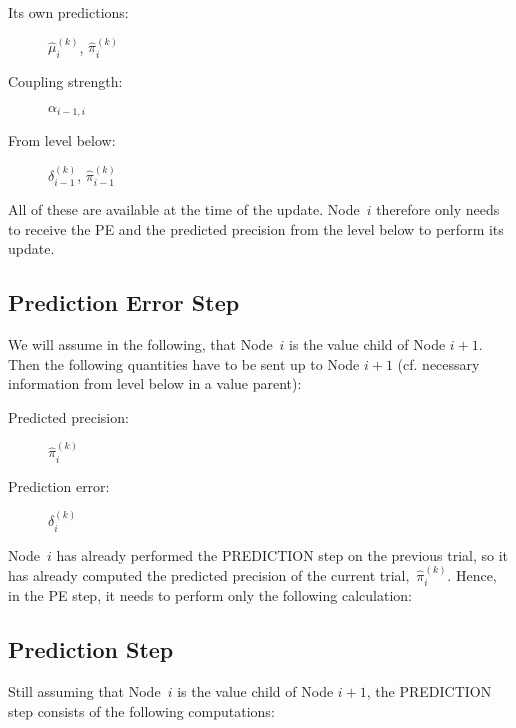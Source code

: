 \begin{description}
\item[Its own predictions:]  	$\hat{\mu}_i^{(k)}$, $\hat{\pi}_i^{(k)}$
\item[Coupling strength:] 		$\alpha_{i-1,i}$
\item[From level below:]		$\delta_{i-1}^{(k)}$, $\hat{\pi}_{i-1}^{(k)}$
\end{description}

All of these are available at the time of the update. Node~$i$ therefore only needs to receive the PE and the predicted precision from the level below to perform its update.

\subsection{Prediction Error Step}
We will assume in the following, that Node~$i$ is the value child of Node $i+1$. Then the following quantities have to be sent up to Node $i+1$ (cf. necessary information from level below in a value parent):

\begin{description}
\item[Predicted precision:] 	$\hat{\pi}_{i}^{(k)}$
\item[Prediction error:]		$\delta_{i}^{(k)}$
\end{description}

Node~$i$ has already performed the \textsf{PREDICTION step} on the previous trial, so it has already computed the predicted precision of the current trial,~$\hat{\pi}_{i}^{(k)}$. Hence, in the \textsf{PE step}, it needs to perform only the following calculation:
\vspace{0.5cm}

\noindent
{}%
\vspace{0.5cm}

\noindent


\subsection{Prediction Step}
Still assuming that Node~$i$ is the value child of Node $i+1$, the \textsf{PREDICTION step} consists of the following computations:
\vspace{0.5cm}

